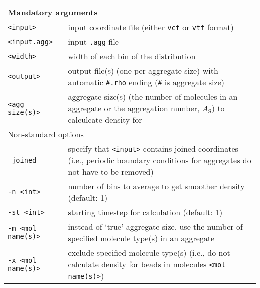 \noindent
\begin{longtable}{p{}p{}}
  \toprule
  \multicolumn{2}{l}{Mandatory arguments} \\
  \midrule
  \texttt{<input>} & input coordinate file (either \texttt{vcf} or
    \texttt{vtf} format) \\
  \texttt{<input.agg>} & input \texttt{.agg} file \\
  \texttt{<width>} & width of each bin of the distribution \\
  \texttt{<output>} & output file(s) (one per aggregate size) with
    automatic \texttt{\#.rho} ending (\texttt{\#} is aggregate size) \\
  \texttt{<agg size(s)>} & aggregate size(s) (the number of molecules in an
    aggregate or the aggregation number, $A_{\mathrm{S}}$) to calculcate
    density for \\
  \toprule
  \multicolumn{2}{l}{Non-standard options} \\
  \midrule
  \texttt{--joined} & specify that \texttt{<input>} contains joined
    coordinates (i.e., periodic boundary conditions for aggregates do not
    have to be removed) \\
  \texttt{-n <int>} & number of bins to average to get smoother density
    (default: 1) \\
  \texttt{-st <int>} & starting timestep for calculation (default: 1) \\
  \texttt{-m <mol name(s)>} & instead of `true' aggregate size, use the number
    of specified molecule type(s) in an aggregate \\
  \texttt{-x <mol name(s)>} & exclude specified molecule type(s) (i.e., do
    not calculate density for beads in molecules \texttt{<mol name(s)>}) \\
  \bottomrule
\end{longtable}

